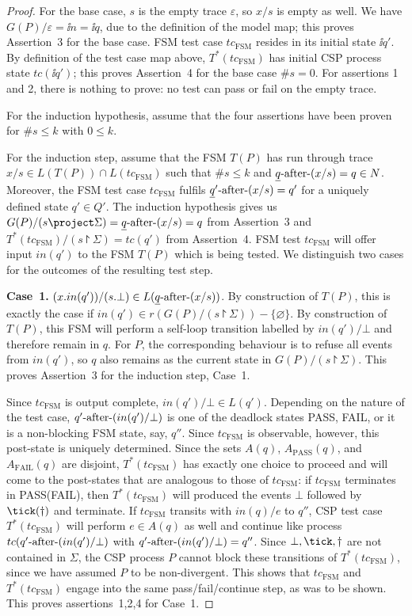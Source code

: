 \begin{proof}
For the base case, $s$ is the empty trace $\varepsilon$, so $x/s$ is empty as well. We have 
$G(P)/\varepsilon = \ii n = \ii q$, due to the definition of the model map; this proves Assertion~3 for the base case. 
FSM test case $tc_\text{FSM}$ resides in its initial state $\ii q'$. By definition of the test case map above, $T^*(tc_\text{FSM})$ has initial CSP process state $tc(\ii q')$; this proves  Assertion~4 for the base case $\#s = 0$. For assertions 1 and 2, there is nothing to
prove: no test can pass or fail on the empty trace.

For the induction hypothesis, assume that the four assertions have been proven for
$\#s \le k$ with $0\le k$.

For the induction step, assume that the FSM $T(P)$ 
has run through trace $x/s\in L(T(P))\cap L(tc_\text{FSM})$ such that
$\#s \le k$ and $\underline{q}\text{-after-}(x/s) = q\in N$. Moreover, the FSM test case
$tc_\text{FSM}$ fulfils  $\underline{q}'\text{-after-} (x/s) = q'$ for a uniquely defined state 
$q'\in Q'$. The induction hypothesis gives us
$G(P)/(s\project\Sigma) = \ii q\after (x/s) = q$
from Assertion~3 and
$T^*(tc_\text{FSM})/(s\project \Sigma) = tc(q')$ from Assertion~4.
FSM test $tc_\text{FSM}$ will offer input $in(q')$ to the FSM $T(P)$ which is being tested. We distinguish two cases  for the outcomes of the resulting test step.

 
\medskip
\noindent
{\bf Case~1.} $(x.in(q'))/(s.\bot) \in L(\underline{q}\text{-after-} (x/s))$.\newline
By construction of $T(P)$, this is exactly the case if 
$in(q')\in r(G(P)/(s\project \Sigma)) - \{ \varnothing\}$. By construction of $T(P)$,
this FSM will perform a self-loop transition labelled by $in(q')/\bot$ and therefore remain in $q$. For $P$, the corresponding behaviour is to refuse all events from 
$in(q')$, so $q$ also remains as the current state in $G(P)/(s\project \Sigma)$. This proves Assertion~3 for the induction step, Case~1.

Since $tc_\text{FSM}$ is output complete,
$in(q')/\bot \in L(q')$. Depending on the nature of the test case, 
$q'\text{-after-} (in(q')/\bot)$ is one of the deadlock states PASS, FAIL, or it is a
non-blocking FSM state, say, $q''$. Since $tc_\text{FSM}$ is observable, however, 
this post-state is uniquely determined. 
Since the sets $A(q)$, $A_\text{PASS}(q)$, and $A_\text{FAIL}(q)$ 
are disjoint,   $T^*(tc_\text{FSM})$
has exactly one choice to proceed and will come to the post-states that are analogous to those of $tc_\text{FSM}$: if $tc_\text{FSM}$ terminates in PASS(FAIL), then 
$T^*(tc_\text{FSM})$ will produced the events $\bot$ followed by 
$\tick(\dag)$ and terminate. If $tc_\text{FSM}$  transits with $in(q)/e$ to $q''$, CSP test case
$T^*(tc_\text{FSM})$ will perform $e\in A(q)$ as well and continue like process 
$tc(q'\text{-after-}(in(q')/\bot)$ with $q'\text{-after-}(in(q')/\bot) = q''$. 
Since $\bot,\tick,\dag$ are not contained in $\Sigma$, the CSP process $P$ 
cannot block these transitions of  $T^*(tc_\text{FSM})$, since we have assumed $P$ to be non-divergent. This shows that $tc_\text{FSM}$ and $T^*(tc_\text{FSM})$ engage into the same pass/fail/continue step, as was to be shown. This proves assertions~1,2,4 
for Case~1.




\end{proof}
